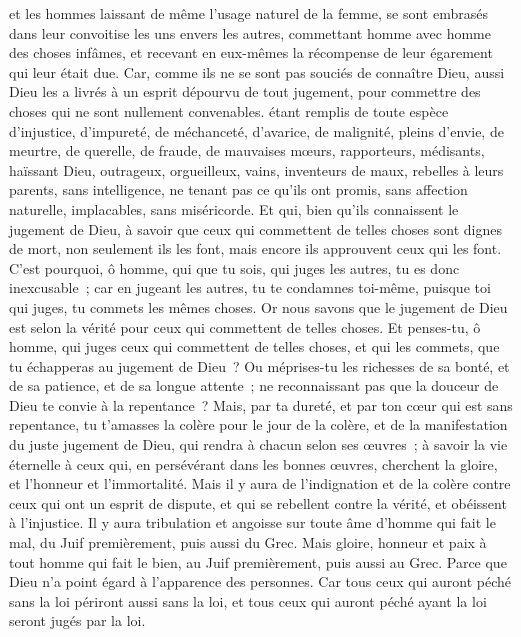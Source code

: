 \begin{multicols}{2}
et les hommes laissant de même l'usage naturel de la femme, se sont embrasés dans leur convoitise les uns envers les autres, commettant homme avec homme des choses infâmes, et recevant en eux-mêmes la récompense de leur égarement qui leur était due.
Car, comme ils ne se sont pas souciés de connaître Dieu, aussi Dieu les a livrés à un esprit dépourvu de tout jugement, pour commettre des choses qui ne sont nullement convenables.
étant remplis de toute espèce d'injustice, d'impureté, de méchanceté, d'avarice, de malignité, pleins d'envie, de meurtre, de querelle, de fraude, de mauvaises mœurs,
rapporteurs, médisants, haïssant Dieu, outrageux, orgueilleux, vains, inventeurs de maux, rebelles à leurs parents,
sans intelligence, ne tenant pas ce qu'ils ont promis, sans affection naturelle, implacables, sans miséricorde.
Et qui, bien qu'ils connaissent le jugement de Dieu, à savoir que ceux qui commettent de telles choses sont dignes de mort, non seulement ils les font, mais encore ils approuvent ceux qui les font.
\VerseOne{}C'est pourquoi, ô homme, qui que tu sois, qui juges les autres, tu es donc inexcusable~; car en jugeant les autres, tu te condamnes toi-même, puisque toi qui juges, tu commets les mêmes choses.
Or nous savons que le jugement de Dieu est selon la vérité pour ceux qui commettent de telles choses.
Et penses-tu, ô homme, qui juges ceux qui commettent de telles choses, et qui les commets, que tu échapperas au jugement de Dieu~?
Ou méprises-tu les richesses de sa bonté, et de sa patience, et de sa longue attente~; ne reconnaissant pas que la douceur de Dieu te convie à la repentance~?
Mais, par ta dureté, et par ton cœur qui est sans repentance, tu t'amasses la colère pour le jour de la colère, et de la manifestation du juste jugement de Dieu,
qui rendra à chacun selon ses œuvres~;
à savoir la vie éternelle à ceux qui, en persévérant dans les bonnes œuvres, cherchent la gloire, et l'honneur et l'immortalité.
Mais il y aura de l'indignation et de la colère contre ceux qui ont un esprit de dispute, et qui se rebellent contre la vérité, et obéissent à l'injustice.
Il y aura tribulation et angoisse sur toute âme d'homme qui fait le mal, du Juif premièrement, puis aussi du Grec.
Mais gloire, honneur et paix à tout homme qui fait le bien, au Juif premièrement, puis aussi au Grec.
Parce que Dieu n'a point égard à l'apparence des personnes.
Car tous ceux qui auront péché sans la loi périront aussi sans la loi, et tous ceux qui auront péché ayant la loi seront jugés par la loi.

\end{multicols}
